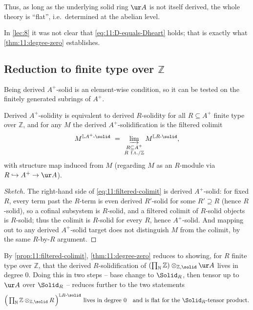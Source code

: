 Thus, as long as the underlying solid ring $\ur A$ is not itself derived, the
whole theory is ``flat'', i.e.\ determined at the abelian level.

\begin{remark}
\label{rmk:11:settled}
In \cref{lec:8} it was not clear that \eqref{eq:11:D-equals-Dheart} holds; that
is exactly what \cref{thm:11:degree-zero} establishes.
\end{remark}

\subsection{Reduction to finite type over \texorpdfstring{$\mathbb{Z}$}{Z}}

Being derived $A^{+}$-solid is an element-wise condition, so it can be tested
on the finitely generated subrings of $A^{+}$.

\begin{proposition}
\label{prop:11:filtered-colimit}
Derived $A^{+}$-solidity is equivalent to derived $R$-solidity for all
$R\subseteq A^{+}$ finite type over $\mathbb{Z}$, and for any $M$ the derived
$A^{+}$-solidification is the filtered colimit
\begin{equation}
\label{eq:11:filtered-colimit}
M^{\mathbb{L}A^{+}\text{-}\solid}\ =\ \varinjlim_{\substack{R\subseteq A^{+}\\
R\ \mathrm{f.t.}/\mathbb{Z}}} M^{\mathbb{L}R\text{-}\solid},
\end{equation}
with structure map induced from $M$ (regarding $M$ as an $R$-module via
$R\hookrightarrow A^{+}\to\ur A$).
\end{proposition}

\begin{proof}[Sketch]
The right-hand side of \eqref{eq:11:filtered-colimit} is derived
$A^{+}$-solid: for fixed $R$, every term past the $R$-term is even derived
$R'$-solid for some $R'\supseteq R$ (hence $R$-solid), so a cofinal subsystem
is $R$-solid, and a filtered colimit of $R$-solid objects is $R$-solid; thus
the colimit is $R$-solid for every $R$, hence $A^{+}$-solid. And mapping out to
any derived $A^{+}$-solid target does not distinguish $M$ from the colimit, by
the same $R$-by-$R$ argument.
\end{proof}

By \cref{prop:11:filtered-colimit}, \cref{thm:11:degree-zero} reduces to
showing, for $R$ finite type over $\mathbb{Z}$, that the derived
$R$-solidification of $(\prod_{\mathbb{N}}\mathbb{Z})\otimes_{\mathbb{Z},\solid}
\ur A$ lives in degree $0$. Doing this in two steps -- base change to
$\Solid_{R}$, then tensor up to $\ur A$ over $\Solid_{R}$ -- reduces further
to the two statements
\begin{equation}
\label{eq:11:two-statements}
\Bigl(\,\textstyle\prod_{\mathbb{N}}\mathbb{Z}\otimes_{\mathbb{Z},\solid}R\,
\Bigr)^{\mathbb{L}R\text{-}\solid}\ \text{lives in degree }0
\quad\text{and is flat for the }\Solid_{R}\text{-tensor product.}
\end{equation}

